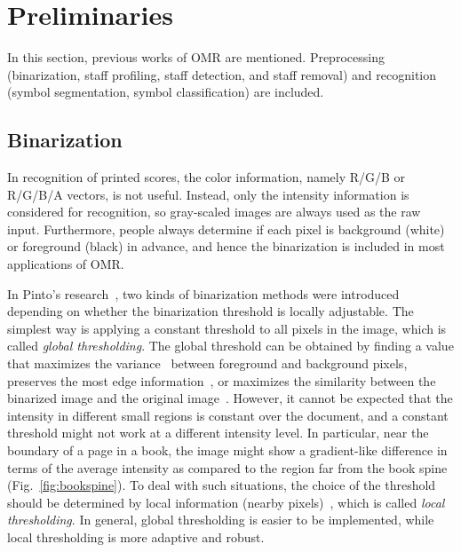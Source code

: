 \chapter{Preliminaries}
\label{c:preliminaries}

In this section, previous works of OMR are mentioned. Preprocessing (binarization, staff profiling, staff detection, and staff removal) and recognition (symbol segmentation, symbol classification) are included. 

\section{Binarization}


\graphicspath{{./figsrc/}}
\fi

In recognition of printed scores, the color information, namely R/G/B or R/G/B/A vectors, is not useful. Instead, only the intensity information is considered for recognition, so gray-scaled images are always used as the raw input. Furthermore, people always determine if each pixel is background (white) or foreground (black) in advance, and hence the binarization is included in most applications of OMR.

In Pinto's research~\cite{Pinto:2011:MSB}, two kinds of binarization methods were introduced depending on whether the binarization threshold is locally adjustable. The simplest way is applying a constant threshold to all pixels in the image, which is called \emph{global thresholding}. The global threshold can be obtained by finding a value that maximizes the variance~\cite{Otsu:1979:ATSMfGLH} between foreground and background pixels, preserves the most edge information~\cite{Chen:2008:ADTIBMboED}, or maximizes the similarity between the binarized image and the original image~\cite{Huang:1995:ITbMtMoF,Tsai:1995:AFTSPfMaUH}. However, it cannot be expected that the intensity in different small regions is constant over the document, and a constant threshold might not work at a different intensity level. In particular, near the boundary of a page in a book, the image might show a gradient-like difference in terms of the average intensity as compared to the region far from the book spine (Fig.~\ref{fig:bookspine}). To deal with such situations, the choice of the threshold should be determined by local information (nearby pixels)~\cite{Bernsen:2005:DToGLI}, which is called \emph{local thresholding}. In general, global thresholding is easier to be implemented, while local thresholding is more adaptive and robust.

